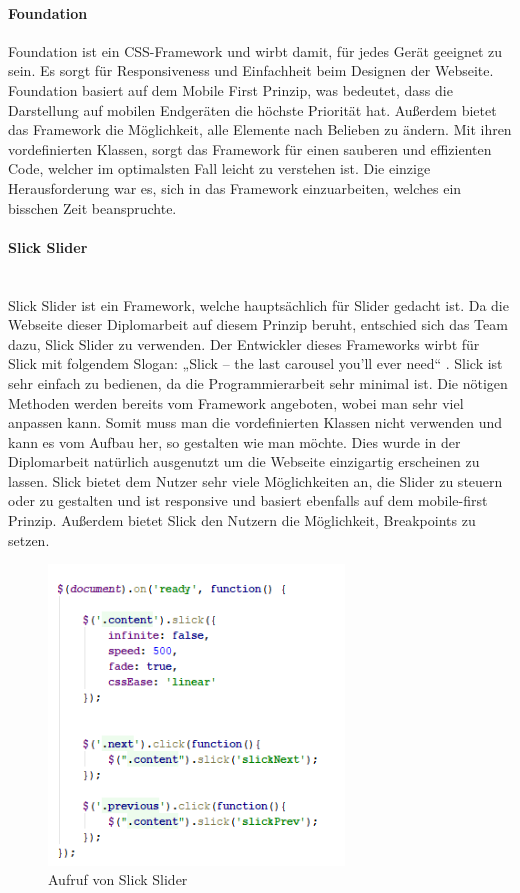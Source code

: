 \paragraph{Foundation}
Foundation ist ein CSS-Framework und wirbt damit, für jedes Gerät geeignet zu sein. Es sorgt für Responsiveness und Einfachheit beim Designen der Webseite. Foundation basiert auf dem Mobile First Prinzip, was bedeutet, dass die Darstellung auf mobilen Endgeräten die höchste Priorität hat.   Außerdem bietet das Framework die Möglichkeit, alle Elemente nach Belieben zu ändern. Mit ihren vordefinierten Klassen, sorgt das Framework für einen sauberen und effizienten Code, welcher im optimalsten Fall leicht zu verstehen ist. Die einzige Herausforderung war es, sich in das Framework einzuarbeiten, welches ein bisschen Zeit beanspruchte. 

\paragraph{Slick Slider}
\leavevmode \\
Slick Slider ist ein Framework, welche hauptsächlich für Slider gedacht ist. Da die Webseite dieser Diplomarbeit auf diesem Prinzip beruht, entschied sich das Team dazu, Slick Slider zu verwenden. Der Entwickler dieses Frameworks wirbt für Slick mit folgendem Slogan: „Slick – the last carousel you’ll ever need“ . Slick ist sehr einfach zu bedienen, da die Programmierarbeit sehr minimal ist. Die nötigen Methoden werden bereits vom Framework angeboten, wobei man sehr viel anpassen kann. Somit muss man die vordefinierten Klassen nicht verwenden und kann es vom Aufbau her, so gestalten wie man möchte. Dies wurde in der Diplomarbeit natürlich ausgenutzt um die Webseite einzigartig erscheinen zu lassen. Slick bietet dem Nutzer sehr viele Möglichkeiten an, die Slider zu steuern oder zu gestalten und ist responsive und basiert ebenfalls auf dem mobile-first Prinzip. Außerdem bietet Slick den Nutzern die Möglichkeit, Breakpoints zu setzen.

\begin{figure}[H] 
  \centering
     \includegraphics[width=0.7\textwidth]{webseite_abb1.png}
  \caption{Aufruf von Slick Slider}

\end{figure}

